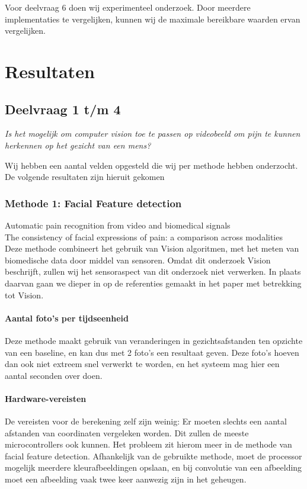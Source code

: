 \documentclass[11pt]{article}
\begin{document}
    Voor deelvraag 6 doen wij experimenteel onderzoek.
    Door meerdere implementaties te vergelijken, kunnen wij de maximale bereikbare waarden ervan vergelijken.


    \section{Resultaten}\label{sec:resultaten}

    \subsection{Deelvraag 1 t/m 4}\label{subsec:deelvraag-1-t/m-4}
    \emph{Is het mogelijk om computer vision toe te passen op videobeeld om pijn te kunnen herkennen op het gezicht van een mens?}

    Wij hebben een aantal velden opgesteld die wij per methode hebben onderzocht.
    De volgende resultaten zijn hieruit gekomen

    \subsubsection{Methode 1: Facial Feature detection}
    \emph{\citet{werner2014automatic}} Automatic pain recognition from video and biomedical signals\\
    \emph{\citet{prkachin1992consistency}} The consistency of facial expressions of pain: a comparison across modalities\\
    Deze methode combineert het gebruik van Vision algoritmen, met het meten van biomedische data door middel van sensoren.
    Omdat dit onderzoek Vision beschrijft, zullen wij het sensoraspect van dit onderzoek niet verwerken. In plaats daarvan gaan we dieper in op de referenties gemaakt in het paper met betrekking tot Vision.

    \paragraph{Aantal foto's per tijdseenheid}
    Deze methode maakt gebruik van veranderingen in gezichtsafstanden ten opzichte van een baseline, en kan dus met 2 foto's een resultaat geven.
    Deze foto's hoeven dan ook niet extreem snel verwerkt te worden, en het systeem mag hier een aantal seconden over doen.

    \paragraph{Hardware-vereisten}\label{meth1-hardware}
    De vereisten voor de berekening zelf zijn weinig: Er moeten slechts een aantal afstanden van coordinaten vergeleken worden.
    Dit zullen de meeste microcontrollers ook kunnen.
    Het probleem zit hierom meer in de methode van facial feature detection.
    Afhankelijk van de gebruikte methode, moet de processor mogelijk meerdere kleurafbeeldingen opslaan, en bij convolutie van een afbeelding moet een afbeelding vaak twee keer aanwezig zijn in het geheugen.
\end{document}
